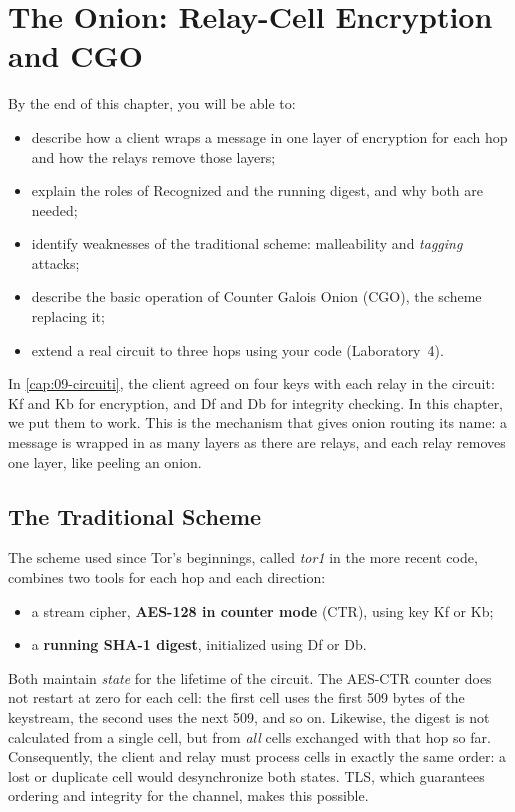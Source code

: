\chapter{The Onion: Relay-Cell Encryption and CGO}\label{cap:10-cifratura-relay}

\begin{obiettivi}
By the end of this chapter, you will be able to:
\begin{itemize}[nosep]
  \item describe how a client wraps a message in one layer of encryption for each hop and how the relays remove those layers;
  \item explain the roles of Recognized and the running digest, and why both are needed;
  \item identify weaknesses of the traditional scheme: malleability and \emph{tagging} attacks;
  \item describe the basic operation of Counter Galois Onion (CGO), the scheme replacing it;
  \item extend a real circuit to three hops using your code (Laboratory~4).
\end{itemize}
\end{obiettivi}

In \cref{cap:09-circuiti}, the client agreed on four keys with each relay in the circuit: Kf and Kb for encryption, and Df and Db for integrity checking. In this chapter, we put them to work. This is the mechanism that gives onion routing its name: a message is wrapped in as many layers as there are relays, and each relay removes one layer, like peeling an onion.

\section{The Traditional Scheme}\label{sec:tor1}

The scheme used since Tor's beginnings, called \emph{tor1} in the more recent code, combines two tools for each hop and each direction:
\begin{itemize}
  \item a stream cipher, \textbf{AES-128 in counter mode} (CTR), using key Kf or Kb;
  \item a \textbf{running SHA-1 digest}, initialized using Df or Db.
\end{itemize}
Both maintain \emph{state} for the lifetime of the circuit. The AES-CTR counter does not restart at zero for each cell: the first cell uses the first 509 bytes of the keystream, the second uses the next 509, and so on. Likewise, the digest is not calculated from a single cell, but from \emph{all} cells exchanged with that hop so far. Consequently, the client and relay must process cells in exactly the same order: a lost or duplicate cell would desynchronize both states. TLS, which guarantees ordering and integrity for the channel, makes this possible.

